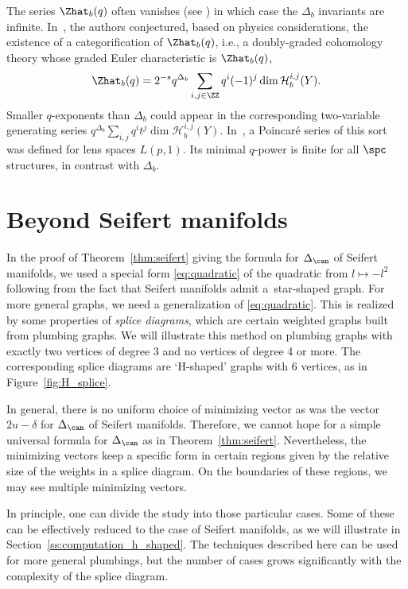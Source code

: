 \documentclass[pdftex]{sigma}
\begin{document}
\begin{Remark}
 The series $\Zhat_b(q)$ often vanishes (see \cite[Corollary~3.7]{GKS23})
 in which case the $\Delta_b$ invariants are infinite. In~\cite{GPPV20}, the authors conjectured, based on physics considerations, the existence of a categorification of $\Zhat_b(q)$, i.e., a doubly-graded cohomology theory  whose graded Euler characteristic is $\Zhat_b(q)$,
 \[
 \Zhat_b(q) = 2^{-s} q^{\Delta_b} \sum_{i, j \in \ZZ} q^i (-1)^j \dim \mathcal{H}_b^{i,j}(Y).
 \]
 Smaller $q$-exponents than $\Delta_b$ could appear in the corresponding two-variable generating series $q^{\Delta_b}\sum_{i,j} q^i t^j \dim \mathcal{H}_b^{i,j}(Y)$. In~\cite{GPV16}, a Poincar\'e series of this sort was defined for lens spaces $L(p,1)$. Its minimal $q$-power is finite for all $\spc$ structures, in contrast with $\Delta_b$.
\end{Remark}

\section{Beyond Seifert manifolds}\label{s:H_shaped}

In the proof of Theorem~\ref{thm:seifert} giving the formula for $\Delta_{\can}$ of Seifert manifolds, we used a special form \eqref{eq:quadratic} of the quadratic from $l \mapsto -l^2$ following from the fact that Seifert manifolds admit a~star-shaped graph. For more general graphs, we need a generalization of \eqref{eq:quadratic}. This is realized by some properties of \emph{splice diagrams}, which are certain weighted graphs built from plumbing graphs. We will illustrate this method on plumbing graphs with exactly two vertices of degree 3 and no vertices of degree 4 or more. The corresponding splice diagrams are `H-shaped' graphs with 6 vertices, as in Figure~\ref{fig:H_splice}.

In general, there is no uniform choice of minimizing vector as was the vector $2u-\delta$ for $\Delta_{\can}$ of Seifert manifolds. Therefore, we cannot hope for a simple universal formula for $\Delta_{\can}$ as in Theorem~\ref{thm:seifert}. Nevertheless, the minimizing vectors keep a specific form in certain regions given by the relative size of the weights in a splice diagram. On the boundaries of these regions, we may see multiple minimizing vectors.

In principle, one can divide the study into those particular cases. Some of these can be effectively reduced to the case of Seifert manifolds, as we will illustrate in Section~\ref{ss:computation_h_shaped}. The techniques described here can be used for more general plumbings, but the number of cases grows significantly with the complexity of the splice diagram.
\end{document}
